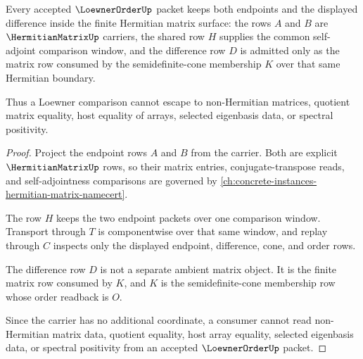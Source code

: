 \begin{theorem}
\label{thm:loewner-order-hermitian-nonescape}
Every accepted $\LoewnerOrderUp$ packet keeps both endpoints and the displayed difference inside the finite Hermitian matrix surface: the rows $A$ and $B$ are $\HermitianMatrixUp$ carriers, the shared row $H$ supplies the common self-adjoint comparison window, and the difference row $D$ is admitted only as the matrix row consumed by the semidefinite-cone membership $K$ over that same Hermitian boundary.

Thus a Loewner comparison cannot escape to non-Hermitian matrices, quotient matrix equality, host equality of arrays, selected eigenbasis data, or spectral positivity.
\end{theorem}
\begin{proof}
Project the endpoint rows $A$ and $B$ from the carrier. Both are explicit $\HermitianMatrixUp$ rows, so their matrix entries, conjugate-transpose reads, and self-adjointness comparisons are governed by \autoref{ch:concrete-instances-hermitian-matrix-namecert}.

The row $H$ keeps the two endpoint packets over one comparison window. Transport through $T$ is componentwise over that same window, and replay through $C$ inspects only the displayed endpoint, difference, cone, and order rows.

The difference row $D$ is not a separate ambient matrix object. It is the finite matrix row consumed by $K$, and $K$ is the semidefinite-cone membership row whose order readback is $O$.

Since the carrier has no additional coordinate, a consumer cannot read non-Hermitian matrix data, quotient equality, host array equality, selected eigenbasis data, or spectral positivity from an accepted $\LoewnerOrderUp$ packet.
\end{proof}

